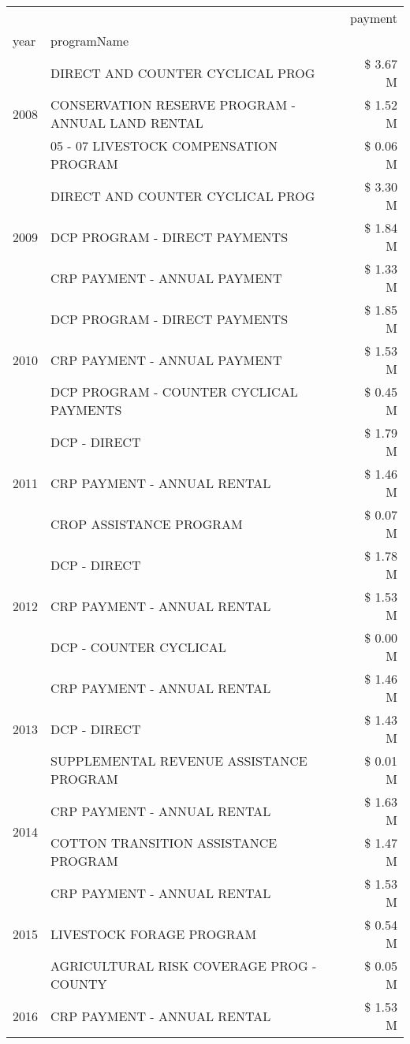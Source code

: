 \begin{tabular}{llr}
\toprule
 &  & payment \\
year & programName &  \\
\midrule
\multirow[t]{3}{*}{2008} & DIRECT AND COUNTER CYCLICAL PROG & \$ 3.67 M \\
 & CONSERVATION RESERVE PROGRAM - ANNUAL LAND RENTAL & \$ 1.52 M \\
 & 05 - 07 LIVESTOCK COMPENSATION PROGRAM & \$ 0.06 M \\
\cline{1-3}
\multirow[t]{3}{*}{2009} & DIRECT AND COUNTER CYCLICAL PROG & \$ 3.30 M \\
 & DCP PROGRAM - DIRECT PAYMENTS & \$ 1.84 M \\
 & CRP PAYMENT - ANNUAL PAYMENT & \$ 1.33 M \\
\cline{1-3}
\multirow[t]{3}{*}{2010} & DCP PROGRAM - DIRECT PAYMENTS & \$ 1.85 M \\
 & CRP PAYMENT - ANNUAL PAYMENT & \$ 1.53 M \\
 & DCP PROGRAM - COUNTER CYCLICAL PAYMENTS & \$ 0.45 M \\
\cline{1-3}
\multirow[t]{3}{*}{2011} & DCP - DIRECT & \$ 1.79 M \\
 & CRP PAYMENT - ANNUAL RENTAL & \$ 1.46 M \\
 & CROP ASSISTANCE PROGRAM & \$ 0.07 M \\
\cline{1-3}
\multirow[t]{3}{*}{2012} & DCP - DIRECT & \$ 1.78 M \\
 & CRP PAYMENT - ANNUAL RENTAL & \$ 1.53 M \\
 & DCP - COUNTER CYCLICAL & \$ 0.00 M \\
\cline{1-3}
\multirow[t]{3}{*}{2013} & CRP PAYMENT - ANNUAL RENTAL & \$ 1.46 M \\
 & DCP - DIRECT & \$ 1.43 M \\
 & SUPPLEMENTAL REVENUE ASSISTANCE PROGRAM & \$ 0.01 M \\
\cline{1-3}
\multirow[t]{2}{*}{2014} & CRP PAYMENT - ANNUAL RENTAL & \$ 1.63 M \\
 & COTTON TRANSITION ASSISTANCE PROGRAM & \$ 1.47 M \\
\cline{1-3}
\multirow[t]{3}{*}{2015} & CRP PAYMENT - ANNUAL RENTAL & \$ 1.53 M \\
 & LIVESTOCK FORAGE PROGRAM & \$ 0.54 M \\
 & AGRICULTURAL RISK COVERAGE PROG - COUNTY & \$ 0.05 M \\
\cline{1-3}
\multirow[t]{3}{*}{2016} & CRP PAYMENT - ANNUAL RENTAL & \$ 1.53 M \\

\end{tabular}
